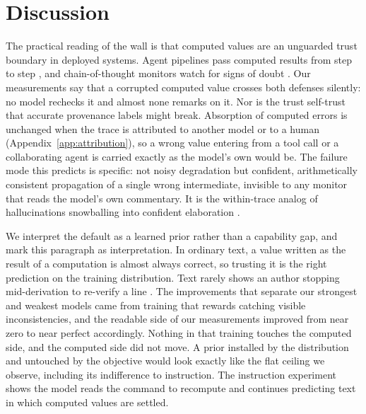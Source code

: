 \section{Discussion}
\label{sec:discussion}

The practical reading of the wall is that computed values are an unguarded trust boundary in deployed systems. Agent pipelines pass computed results from step to step \citep{yao2023react,kapoor2024agents}, and chain-of-thought monitors watch for signs of doubt \citep{baker2025monitoring,korbak2025monitorability}. Our measurements say that a corrupted computed value crosses both defenses silently: no model rechecks it and almost none remarks on it. Nor is the trust self-trust that accurate provenance labels might break. Absorption of computed errors is unchanged when the trace is attributed to another model or to a human (Appendix~\ref{app:attribution}), so a wrong value entering from a tool call or a collaborating agent is carried exactly as the model's own would be. The failure mode this predicts is specific: not noisy degradation but confident, arithmetically consistent propagation of a single wrong intermediate, invisible to any monitor that reads the model's own commentary. It is the within-trace analog of hallucinations snowballing into confident elaboration \citep{zhang2023snowball}.

We interpret the default as a learned prior rather than a capability gap, and mark this paragraph as interpretation. In ordinary text, a value written as the result of a computation is almost always correct, so trusting it is the right prediction on the training distribution. Text rarely shows an author stopping mid-derivation to re-verify a line \citep{mccoy2024embers,prystawski2023why}. The improvements that separate our strongest and weakest models came from training that rewards catching visible inconsistencies, and the readable side of our measurements improved from near zero to near perfect accordingly. Nothing in that training touches the computed side, and the computed side did not move. A prior installed by the distribution and untouched by the objective would look exactly like the flat ceiling we observe, including its indifference to instruction. The instruction experiment shows the model reads the command to recompute and continues predicting text in which computed values are settled.

